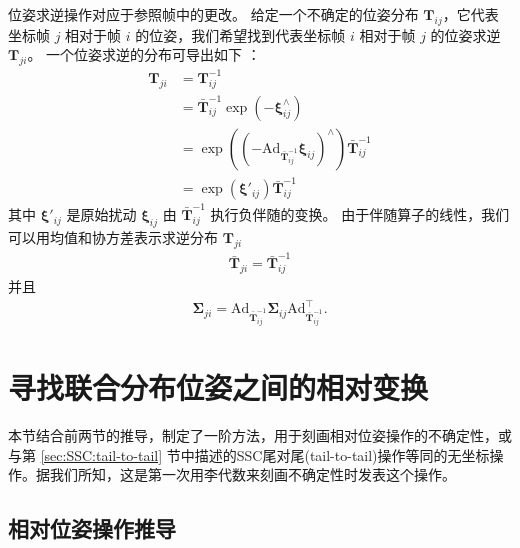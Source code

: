 位姿求逆操作对应于参照帧中的更改。 
给定一个不确定的位姿分布 $\mathbf{T}_{ij}$，它代表坐标帧 $j$ 相对于帧 $i$ 的位姿，我们希望找到代表坐标帧 $i$ 相对于帧 $j$ 的位姿求逆 $\mathbf{T}_{ji}$。 
一个位姿求逆的分布可导出如下 \cite{eade2017lie}： 
\begin{align}
    \mathbf{T}_{ji} &= \mathbf{T}_{ij}^{-1} \nonumber\\
    &= \bar{\mathbf{T}}_{ij}^{-1} \operatorname{exp}(- \boldsymbol{\xi}_{ij}^{\wedge}) \label{eq:pose_inverse}\\
    &= \operatorname{exp}((-\mathrm{Ad}_{\bar{\mathbf{T}}_{ij}^{-1}}\boldsymbol{\xi}_{ij})^\wedge) \bar{\mathbf{T}}_{ij}^{-1} \nonumber\\
    &= \operatorname{exp}(\boldsymbol{\xi}'_{ij}) \bar{\mathbf{T}}_{ij}^{-1} \nonumber
\end{align}
其中 $\boldsymbol{\xi}'_{ij}$ 是原始扰动 $\boldsymbol{\xi}_{ij}$ 由 $\bar{\mathbf{T}}_{ij}^{-1}$ 执行负伴随的变换。 %
由于伴随算子的线性，我们可以用均值和协方差表示求逆分布 $\mathbf{T}_{ji}$ 
\begin{align}
    \bar{\mathbf{T}}_{ji} = \bar{\mathbf{T}}_{ij}^{-1}
\end{align}
并且
\begin{align}
    \boldsymbol{\Sigma}_{ji} = \mathrm{Ad}_{\bar{\mathbf{T}}_{ij}^{-1}} \boldsymbol{\Sigma}_{ij} \mathrm{Ad}_{\bar{\mathbf{T}}_{ij}^{-1}}^\top.
\end{align}

\section{寻找联合分布位姿之间的相对变换}
\label{sec:relative_pose}

本节结合前两节的推导，制定了一阶方法，用于刻画相对位姿操作的不确定性，或与第 \ref{sec:SSC:tail-to-tail} 节中描述的SSC尾对尾(tail-to-tail)操作等同的无坐标操作。据我们所知，这是第一次用李代数来刻画不确定性时发表这个操作。 

\subsection{相对位姿操作推导}

